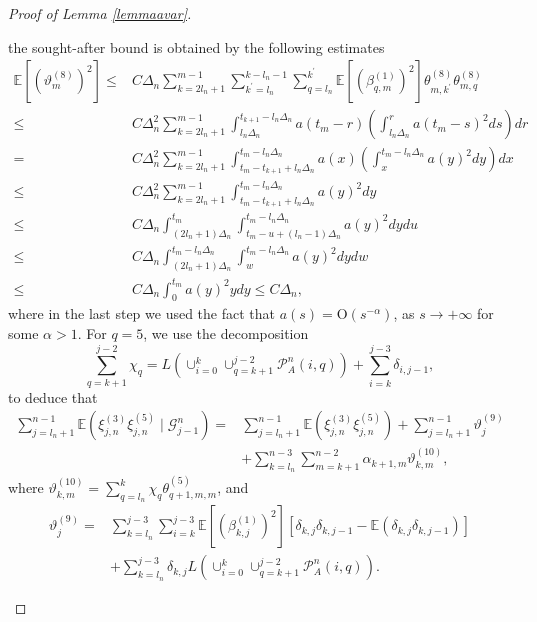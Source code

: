 \documentclass[10pt,a4paper]{amsart}
\begin{document}
\begin{proof}[Proof of Lemma \ref{lemmaavar}]
\begin{description}
		the sought-after bound is obtained by the following estimates
		\begin{align*}
			\mathbb{E}[(\vartheta_{m}^{(8)})^{2}]\leq & C\Delta_{n}\sum_{k=2l_{n}+1}^{m-1}\sum_{k^{\prime}=l_{n}}^{k-l_{n}-1}\sum_{q=l_{n}}^{k^{\prime}}\mathbb{E}[(\beta_{q,m}^{(1)})^{2}]\theta_{m,k^{\prime}}^{(8)}\theta_{m,q}^{(8)}\\
			\leq & C\Delta_{n}^{2}\sum_{k=2l_{n}+1}^{m-1}\int_{l_{n}\Delta_{n}}^{t_{k+1}-l_{n}\Delta_{n}}a(t_{m}-r)\left(\int_{l_{n}\Delta_{n}}^{r}a(t_{m}-s)^{2}ds\right)dr\\
			= & C\Delta_{n}^{2}\sum_{k=2l_{n}+1}^{m-1}\int_{t_{m}-t_{k+1}+l_{n}\Delta_{n}}^{t_{m}-l_{n}\Delta_{n}}a(x)\left(\int_{x}^{t_{m}-l_{n}\Delta_{n}}a(y)^{2}dy\right)dx\\
			\leq & C\Delta_{n}^{2}\sum_{k=2l_{n}+1}^{m-1}\int_{t_{m}-t_{k+1}+l_{n}\Delta_{n}}^{t_{m}-l_{n}\Delta_{n}}a(y)^{2}dy\\
			\leq & C\Delta_{n}\int_{(2l_{n}+1)\Delta_{n}}^{t_{m}}\int_{t_{m}-u+(l_{n}-1)\Delta_{n}}^{t_{m}-l_{n}\Delta_{n}}a(y)^{2}dydu\\
			\leq & C\Delta_{n}\int_{(2l_{n}+1)\Delta_{n}}^{t_{m}-l_{n}\Delta_{n}}\int_{w}^{t_{m}-l_{n}\Delta_{n}}a(y)^{2}dydw\\
			\leq & C\Delta_{n}\int_{0}^{t_{m}}a(y)^{2}ydy\leq C\Delta_{n},
		\end{align*}
		where in the last step we used the fact that $a(s)=\mathrm{O}(s^{-\alpha})$,
		as $s\rightarrow+\infty$ for some $\alpha>1$. For $q=5$, we use
		the decomposition 
		\[
		\sum_{q=k+1}^{j-2}\chi_{q}=L(\cup_{i=0}^{k}\cup_{q=k+1}^{j-2}\mathcal{P}_{A}^{n}(i,q))+\sum_{i=k}^{j-3}\delta_{i,j-1},
		\]
		to deduce that 
		\begin{align*}
			\sum_{j=l_{n}+1}^{n-1}\mathbb{E}(\xi_{j,n}^{(3)}\xi_{j,n}^{(5)}\mid\mathscr{G}_{j-1}^{n})= & \sum_{j=l_{n}+1}^{n-1}\mathbb{E}(\xi_{j,n}^{(3)}\xi_{j,n}^{(5)})+\sum_{j=l_{n}+1}^{n-1}\vartheta_{j}^{(9)}\\
			& +\sum_{k=l_{n}}^{n-3}\sum_{m=k+1}^{n-2}\alpha_{k+1,m}\vartheta_{k,m}^{(10)},
		\end{align*}
		where $\vartheta_{k,m}^{(10)}  =\sum_{q=l_{n}}^{k}\chi_{q}\theta_{q+1,m,m}^{(5)}$, and
		\begin{align*}
			\vartheta_{j}^{(9)}= & \sum_{k=l_{n}}^{j-3}\sum_{i=k}^{j-3}\mathbb{E}[(\beta_{k,j}^{(1)})^{2}][\delta_{k,j}\delta_{k,j-1}-\mathbb{E}(\delta_{k,j}\delta_{k,j-1})]\\
			& +\sum_{k=l_{n}}^{j-3}\delta_{k,j}L(\cup_{i=0}^{k}\cup_{q=k+1}^{j-2}\mathcal{P}_{A}^{n}(i,q)).	

\end{align*}
\end{description}
\end{proof}
\end{document}
